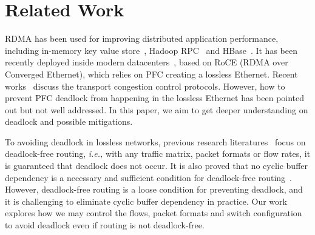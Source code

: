 \section{Related Work}

 RDMA has been used for improving distributed application performance,
including in-memory key value store~\cite{mitchell13atc, farm, kalia14sigcomm}, 
Hadoop RPC~\cite{hadooprdma} and HBase~\cite{hbaserdma}.
It has been recently deployed inside modern datacenters~\cite{timely,dcqcn,rdmascale}, based on
RoCE (RDMA over Converged Ethernet), which relies on PFC creating a lossless Ethernet.
Recent works~\cite{timely,dcqcn} discuss the transport congestion control protocols. However,
how to prevent PFC deadlock from happening in the lossless Ethernet has been pointed out 
but not well addressed. In this paper, we aim to get deeper understanding on deadlock 
and possible mitigations.

 To avoiding deadlock in lossless networks, previous research 
literatures~\cite{tcpbolt,karol2003prevention} focus on deadlock-free routing, 
{\em i.e.,} with any traffic matrix, packet formats or flow rates, it is guaranteed that deadlock 
does not occur. It is also proved that no cyclic buffer dependency is a necessary and
sufficient condition for deadlock-free routing~\cite{deadlockfree}. However, deadlock-free
routing is a loose condition for preventing deadlock, and it is challenging to eliminate 
cyclic buffer dependency in practice. Our work explores how we may control the flows,
packet formats and switch configuration to avoid deadlock even if routing is not deadlock-free.






